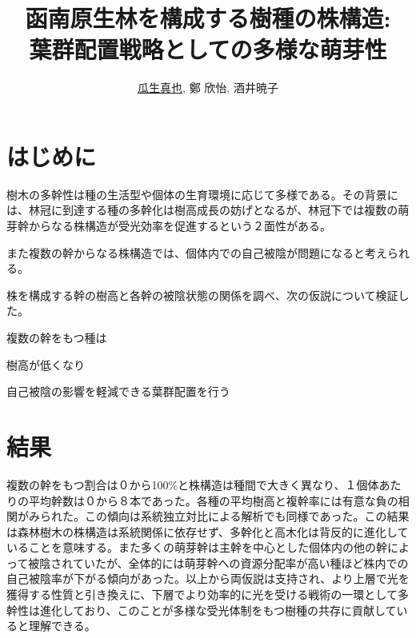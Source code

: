 \documentclass[a0, 36pt, plainboxedsections]{sciposter} %
\title{函南原生林を構成する樹種の株構造:\\葉群配置戦略としての多様な萌芽性}
\author{\underline{瓜生真也}, 鄭 欣怡, 酒井暁子}
\institute{横浜国立大・院・環境情報}
\begin{document}
\maketitle
\begin{multicols}{2}
\section*{\huge{はじめに}}

樹木の多幹性は種の生活型や個体の生育環境に応じて多様である。その背景には、林冠に到達する種の多幹化は樹高成長の妨げとなるが、林冠下では複数の萌芽幹からなる株構造が受光効率を促進するという２面性がある。

また複数の幹からなる株構造では、個体内での自己被陰が問題になると考えられる。

株を構成する幹の樹高と各幹の被陰状態の関係を調べ、次の仮説について検証した。

複数の幹をもつ種は

\begin{list}{}{\setlength{\itemindent}{2em}} %
 \item 樹高が低くなり
 \item 自己被陰の影響を軽減できる葉群配置を行う
\end{list}

\section*{\huge{\color{red}{考察・まとめ}}}

\end{multicols}

\section*{\huge{結果}}

複数の幹をもつ割合は０から100\%と株構造は種間で大きく異なり、１個体あたりの平均幹数は０から８本であった。各種の平均樹高と複幹率には有意な負の相関がみられた。この傾向は系統独立対比による解析でも同様であった。この結果は森林樹木の株構造は系統関係に依存せず、多幹化と高木化は背反的に進化していることを意味する。また多くの萌芽幹は主幹を中心とした個体内の他の幹によって被陰されていたが、全体的には萌芽幹への資源分配率が高い種ほど株内での自己被陰率が下がる傾向があった。以上から両仮説は支持され、より上層で光を獲得する性質と引き換えに、下層でより効率的に光を受ける戦術の一環として多幹性は進化しており、このことが多様な受光体制をもつ樹種の共存に貢献していると理解できる。
\end{document}
